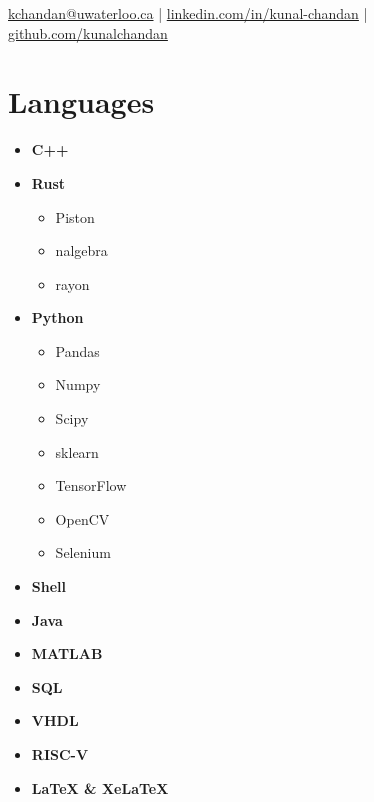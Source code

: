 \documentclass[]{chandan-cv}
\begin{document}
%
%

%
%
{
	\href{mailto:kchandan@uwaterloo.ca}{kchandan@uwaterloo.ca} \qquad
	| \qquad
	\href{https://www.linkedin.com/in/kunal-chandan/}{linkedin.com/in/kunal-chandan} \qquad
	| \qquad
	\href{http://github.com/kunalchandan}{github.com/kunalchandan}
}

%
%

\begin{minipage}[t]{0.23\textwidth}


\section{Languages}
	\begin{itemize}
		\setlength\itemsep{-0.2em}
		\item \textbf{C++}
		\item \textbf{Rust}
				\begin{itemize}
						\setlength\itemsep{-0.17em}
						\item Piston
						\item nalgebra
						\item rayon
				\end{itemize}
		\item \textbf{Python}
			\begin{itemize}
				\setlength\itemsep{-0.17em}
				\item Pandas
				\item Numpy
				\item Scipy
				\item sklearn
				\item TensorFlow
				\item OpenCV
				\item Selenium
			\end{itemize}
		\item \textbf{Shell}
		\item \textbf{Java}
		\item \textbf{MATLAB}
		\item \textbf{SQL}
		\item \textbf{VHDL}
		\item \textbf{RISC-V}
		\item \textbf{LaTeX \& XeLaTeX}
	\end{itemize}


\end{minipage}
\end{document}

